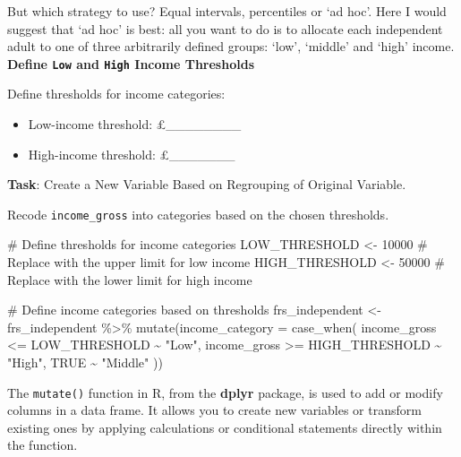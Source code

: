 \documentclass[
  letterpaper,
  DIV=11,
  numbers=noendperiod]{scrreprt}
\newenvironment{Shaded}{\begin{snugshade}}{\end{snugshade}}
\newcommand{\AttributeTok}[1]{\textcolor[rgb]{0.40,0.45,0.13}{#1}}
\newcommand{\CommentTok}[1]{\textcolor[rgb]{0.37,0.37,0.37}{#1}}
\newcommand{\ConstantTok}[1]{\textcolor[rgb]{0.56,0.35,0.01}{#1}}
\newcommand{\DecValTok}[1]{\textcolor[rgb]{0.68,0.00,0.00}{#1}}
\newcommand{\FunctionTok}[1]{\textcolor[rgb]{0.28,0.35,0.67}{#1}}
\newcommand{\NormalTok}[1]{\textcolor[rgb]{0.00,0.23,0.31}{#1}}
\newcommand{\OtherTok}[1]{\textcolor[rgb]{0.00,0.23,0.31}{#1}}
\newcommand{\SpecialCharTok}[1]{\textcolor[rgb]{0.37,0.37,0.37}{#1}}
\newcommand{\StringTok}[1]{\textcolor[rgb]{0.13,0.47,0.30}{#1}}
\providecommand{\tightlist}{%
  \setlength{\itemsep}{0pt}\setlength{\parskip}{0pt}}\usepackage{longtable,booktabs,array}
\begin{document}
But which strategy to use? Equal intervals, percentiles or `ad hoc'.
Here I would suggest that `ad hoc' is best: all you want to do is to
allocate each independent adult to one of three arbitrarily defined
groups: `low', `middle' and `high' income. \textbf{Define \texttt{Low}
and \texttt{High} Income Thresholds}

Define thresholds for income categories:

\begin{itemize}
\tightlist
\item
  Low-income threshold: £\_\_\_\_\_\_\_\_
\item
  High-income threshold: £\_\_\_\_\_\_\_
\end{itemize}

\textbf{Task}: Create a New Variable Based on Regrouping of Original
Variable.

Recode \texttt{income\_gross} into categories based on the chosen
thresholds.

\begin{Shaded}
\begin{Highlighting}[]
\CommentTok{\# Define thresholds for income categories }
\NormalTok{LOW\_THRESHOLD }\OtherTok{\textless{}{-}} \DecValTok{10000} \CommentTok{\# Replace with the upper limit for low income }
\NormalTok{HIGH\_THRESHOLD }\OtherTok{\textless{}{-}} \DecValTok{50000} \CommentTok{\# Replace with the lower limit for high income }

\CommentTok{\# Define income categories based on thresholds }
\NormalTok{frs\_independent }\OtherTok{\textless{}{-}}\NormalTok{ frs\_independent }\SpecialCharTok{\%\textgreater{}\%} 
    \FunctionTok{mutate}\NormalTok{(}\AttributeTok{income\_category =} \FunctionTok{case\_when}\NormalTok{( }
\NormalTok{        income\_gross }\SpecialCharTok{\textless{}=}\NormalTok{ LOW\_THRESHOLD }\SpecialCharTok{\textasciitilde{}} \StringTok{"Low"}\NormalTok{, }
\NormalTok{        income\_gross }\SpecialCharTok{\textgreater{}=}\NormalTok{ HIGH\_THRESHOLD }\SpecialCharTok{\textasciitilde{}} \StringTok{"High"}\NormalTok{, }
        \ConstantTok{TRUE} \SpecialCharTok{\textasciitilde{}} \StringTok{"Middle"}\NormalTok{ ))}
\end{Highlighting}
\end{Shaded}

The \texttt{mutate()} function in R, from the \textbf{dplyr} package, is
used to add or modify columns in a data frame. It allows you to create
new variables or transform existing ones by applying calculations or
conditional statements directly within the function.
\end{document}
